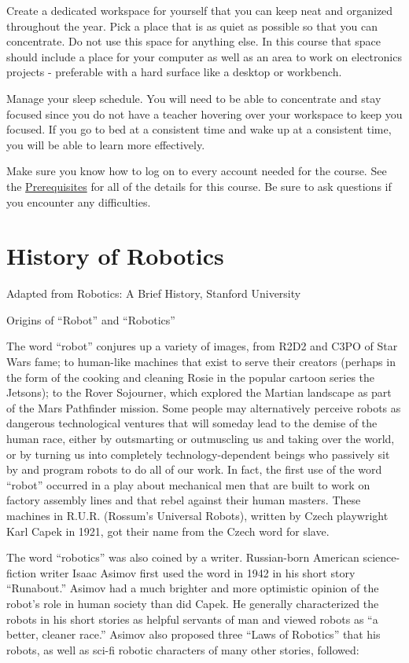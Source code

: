 \documentclass[
]{book}
\begin{document}
Create a dedicated workspace for yourself that you can keep neat and organized throughout the year. Pick a place that is as quiet as possible so that you can concentrate. Do not use this space for anything else. In this course that space should include a place for your computer as well as an area to work on electronics projects - preferable with a hard surface like a desktop or workbench.

Manage your sleep schedule. You will need to be able to concentrate and stay focused since you do not have a teacher hovering over your workspace to keep you focused. If you go to bed at a consistent time and wake up at a consistent time, you will be able to learn more effectively.

Make sure you know how to log on to every account needed for the course. See the \protect\hyperlink{prerequisites}{Prerequisites} for all of the details for this course. Be sure to ask questions if you encounter any difficulties.

\hypertarget{history-of-robotics}{%
\section{History of Robotics}\label{history-of-robotics}}

Adapted from Robotics: A Brief History, Stanford University

Origins of ``Robot'' and ``Robotics''

The word ``robot'' conjures up a variety of images, from R2D2 and C3PO of Star Wars fame; to human-like machines that exist to serve their creators (perhaps in the form of the cooking and cleaning Rosie in the popular cartoon series the Jetsons); to the Rover Sojourner, which explored the Martian landscape as part of the Mars Pathfinder mission. Some people may alternatively perceive robots as dangerous technological ventures that will someday lead to the demise of the human race, either by outsmarting or outmuscling us and taking over the world, or by turning us into completely technology-dependent beings who passively sit by and program robots to do all of our work. In fact, the first use of the word ``robot'' occurred in a play about mechanical men that are built to work on factory assembly lines and that rebel against their human masters. These machines in R.U.R. (Rossum's Universal Robots), written by Czech playwright Karl Capek in 1921, got their name from the Czech word for slave.

The word ``robotics'' was also coined by a writer. Russian-born American science-fiction writer Isaac Asimov first used the word in 1942 in his short story ``Runabout.'' Asimov had a much brighter and more optimistic opinion of the robot's role in human society than did Capek. He generally characterized the robots in his short stories as helpful servants of man and viewed robots as ``a better, cleaner race.'' Asimov also proposed three ``Laws of Robotics'' that his robots, as well as sci-fi robotic characters of many other stories, followed:
\end{document}
